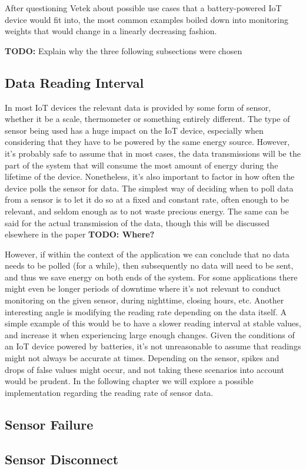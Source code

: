 After questioning Vetek about possible use cases that a battery-powered IoT device would fit into, the most common examples boiled down into monitoring weights that would change in a linearly decreasing fashion. 

\textbf{TODO:} Explain why the three following subsections were chosen

\subsection{Data Reading Interval}
In most IoT devices the relevant data is provided by some form of sensor, whether it be a scale, thermometer or something entirely different. The type of sensor being used has a huge impact on the IoT device, especially when considering that they have to be powered by the same energy source. However, it's probably safe to assume that in most cases, the data transmissions will be the part of the system that will consume the most amount of energy during the lifetime of the device. Nonetheless, it's also important to factor in how often the device polls the sensor for data. The simplest way of deciding when to poll data from a sensor is to let it do so at a fixed and constant rate, often enough to be relevant, and seldom enough as to not waste precious energy. The same can be said for the actual transmission of the data, though this will be discussed elsewhere in the paper \textbf{TODO: Where?}

However, if within the context of the application we can conclude that no data needs to be polled (for a while), then subsequently no data will need to be sent, and thus we save energy on both ends of the system. For some applications there might even be longer periods of downtime where it's not relevant to conduct monitoring on the given sensor, \eg during nighttime, closing hours, etc. Another interesting angle is modifying the reading rate depending on the data itself. A simple example of this would be to have a slower reading interval at stable values, and increase it when experiencing large enough changes. Given the conditions of an IoT device powered by batteries, it's not unreasonable to assume that readings might not always be accurate at times. Depending on the sensor, spikes and drops of false values might occur, and not taking these scenarios into account would be prudent. In the following chapter we will explore a possible implementation regarding the reading rate of sensor data.

\subsection{Sensor Failure}

\subsection{Sensor Disconnect}
